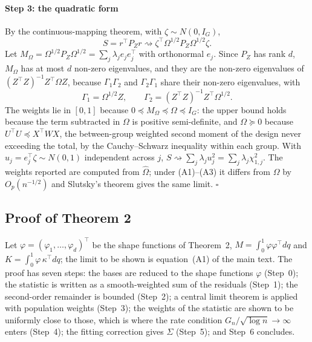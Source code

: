 \documentclass[11pt]{article}
\providecommand{\qed}{\ensuremath{\square}}
\begin{document}
\paragraph{Step 3: the quadratic form} By the continuous-mapping theorem,
with $\zeta\sim N(0,I_G)$,
\[
S=r^\top P_Zr\rightsquigarrow\zeta^\top\Omega^{1/2}P_Z\Omega^{1/2}\zeta .
\]
Let $M_\Omega=\Omega^{1/2}P_Z\Omega^{1/2}=\sum_j\lambda_je_je_j^\top$ with orthonormal $e_j$. Since
$P_Z$ has rank $d$, $M_\Omega$ has at most $d$ non-zero eigenvalues, and they are the non-zero
eigenvalues of $(Z^\top Z)^{-1}Z^\top\Omega Z$, because $\Gamma_1\Gamma_2$ and $\Gamma_2\Gamma_1$ share their
non-zero eigenvalues, with
\[
\Gamma_1=\Omega^{1/2}Z,\qquad \Gamma_2=(Z^\top Z)^{-1}Z^\top\Omega^{1/2}.
\]
The weights lie in
$[0,1]$ because $0\preceq M_\Omega\preceq\Omega\preceq I_G$: the upper bound holds because the term
subtracted in $\Omega$ is positive semi-definite, and $\Omega\succeq0$ because $U^\top U\preceq
X^\top WX$, the between-group weighted second moment of the design never exceeding the total, by the
Cauchy--Schwarz inequality within each group. With $u_j=e_j^\top\zeta\sim N(0,1)$ independent across
$j$, $S\rightsquigarrow\sum_j\lambda_ju_j^2=\sum_j\lambda_j\chi^2_{1,j}$. The weights reported are
computed from $\widehat\Omega$; under (A1)--(A3) it differs from $\Omega$ by $O_p(n^{-1/2})$ and
Slutsky's theorem gives the same limit. \qed

\subsection*{Proof of Theorem 2}

Let $\varphi=(\varphi_1,\dots,\varphi_d)^\top$ be the shape functions of Theorem~2,
$M=\int_0^1\varphi\varphi^\top dq$ and $K=\int_0^1\varphi\,\kappa^\top dq$; the limit to be shown is
equation~(A1) of the main text. The proof has seven steps: the bases are reduced to the shape
functions $\varphi$ (Step~0); the statistic is written as a smooth-weighted sum of the residuals
(Step~1); the second-order remainder is bounded (Step~2); a central limit theorem is applied with
population weights (Step~3); the weights of the statistic are shown to be uniformly close to those,
which is where the rate condition $G_n/\sqrt{\log n}\to\infty$ enters (Step~4); the fitting correction
gives $\Sigma$ (Step~5); and Step~6 concludes.
\end{document}
